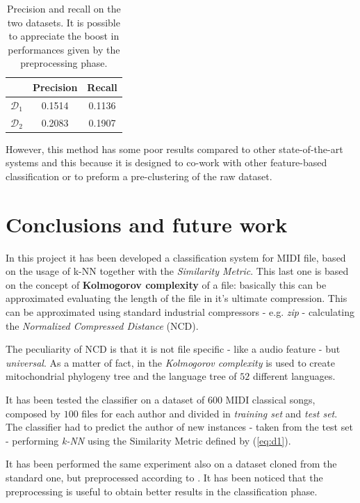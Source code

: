 \documentclass[a4paper]{article}
\begin{document}
	\begin{table}[!hf]
		\centering
		\label{tab:stats}
		\begin{tabular}{| c | c | c |}
			\hline
			& Precision & Recall \\ \hline
			$\mathcal{D}_1$ & 0.1514 & 0.1136 \\ 
			$\mathcal{D}_2$ & 0.2083 & 0.1907 \\ 
			\hline
		\end{tabular}
		\caption{Precision and recall on the two datasets. It is possible to appreciate the boost in performances given by the preprocessing phase.}
	\end{table}
	
	However, this method has some poor results compared to other state-of-the-art systems and this because it is designed to co-work with other feature-based classification or to preform a pre-clustering of the raw dataset.
	
	\section{Conclusions and future work}
	\lettrine[nindent=0em,lines=2]{I}{}n this project it has been developed a classification system for MIDI file, based on the usage of k-NN together with the \textit{Similarity Metric}. This last one is based on the concept of \textbf{Kolmogorov complexity} of a file: basically this can be approximated evaluating the length of the file in it's ultimate compression. This can be approximated using standard industrial compressors - e.g. \textit{zip} - calculating the \textit{Normalized Compressed Distance} (NCD). 
	
	The peculiarity of NCD is that it is not file specific - like a audio feature - but \textit{universal}. As a matter of fact, in \cite{kolmogorov} the \textit{Kolmogorov complexity} is used to create mitochondrial phylogeny tree and the language tree of $52$ different languages.
	
	It has been tested the classifier on a dataset of $600$ MIDI classical songs, composed by $100$ files for each author and divided in \textit{training set} and \textit{test set}. The classifier had to predict the author of new instances - taken from the test set - performing \textit{k-NN} using the Similarity Metric defined by (\ref{eq:d1}). 
	
	It has been performed the same experiment also on a dataset cloned from the standard one, but preprocessed according to \cite{melody_class}. It has been noticed that the preprocessing is useful to obtain better results in the classification phase.
	
\end{document}
